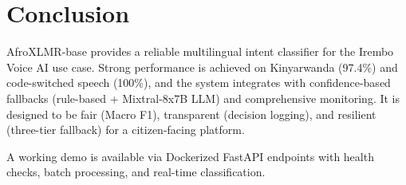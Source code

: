\documentclass[11pt]{article}
\begin{document}
\section*{Conclusion}

AfroXLMR-base provides a reliable multilingual intent classifier for the Irembo Voice AI use case. Strong performance is achieved on Kinyarwanda (97.4\%) and code-switched speech (100\%), and the system integrates with confidence-based fallbacks (rule-based + Mixtral-8x7B LLM) and comprehensive monitoring. It is designed to be fair (Macro F1), transparent (decision logging), and resilient (three-tier fallback) for a citizen-facing platform.

A working demo is available via Dockerized FastAPI endpoints with health checks, batch processing, and real-time classification.
\end{document}
